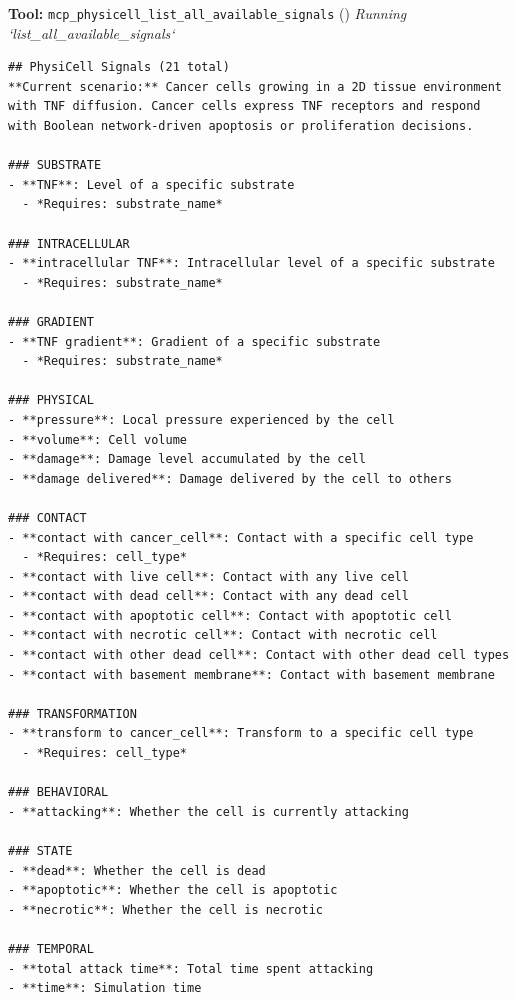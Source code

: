 \documentclass[11pt,a4paper]{article}
\begin{document}
\begin{toolokbox}
\textbf{Tool:} \texttt{mcp\_physicell\_list\_all\_available\_signals} (\checkmark)
\textit{Running `list\_all\_available\_signals`}
\begin{lstlisting}
## PhysiCell Signals (21 total)
**Current scenario:** Cancer cells growing in a 2D tissue environment with TNF diffusion. Cancer cells express TNF receptors and respond with Boolean network-driven apoptosis or proliferation decisions.

### SUBSTRATE
- **TNF**: Level of a specific substrate
  - *Requires: substrate_name*

### INTRACELLULAR
- **intracellular TNF**: Intracellular level of a specific substrate
  - *Requires: substrate_name*

### GRADIENT
- **TNF gradient**: Gradient of a specific substrate
  - *Requires: substrate_name*

### PHYSICAL
- **pressure**: Local pressure experienced by the cell
- **volume**: Cell volume
- **damage**: Damage level accumulated by the cell
- **damage delivered**: Damage delivered by the cell to others

### CONTACT
- **contact with cancer_cell**: Contact with a specific cell type
  - *Requires: cell_type*
- **contact with live cell**: Contact with any live cell
- **contact with dead cell**: Contact with any dead cell
- **contact with apoptotic cell**: Contact with apoptotic cell
- **contact with necrotic cell**: Contact with necrotic cell
- **contact with other dead cell**: Contact with other dead cell types
- **contact with basement membrane**: Contact with basement membrane

### TRANSFORMATION
- **transform to cancer_cell**: Transform to a specific cell type
  - *Requires: cell_type*

### BEHAVIORAL
- **attacking**: Whether the cell is currently attacking

### STATE
- **dead**: Whether the cell is dead
- **apoptotic**: Whether the cell is apoptotic
- **necrotic**: Whether the cell is necrotic

### TEMPORAL
- **total attack time**: Total time spent attacking
- **time**: Simulation time


\end{lstlisting}
\end{toolokbox}
\end{document}
